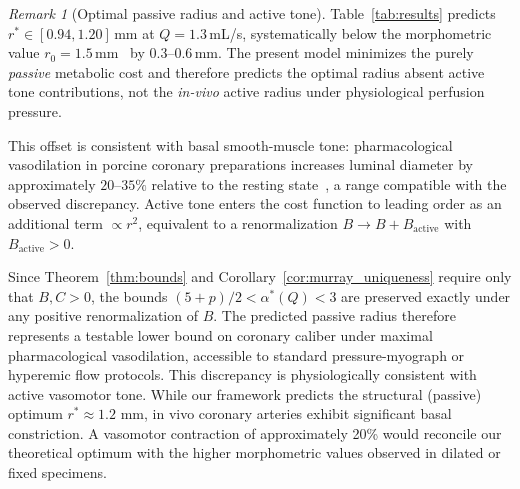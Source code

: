 \documentclass[11pt,a4paper]{article}
\theoremstyle{remark}
\newtheorem{remark}{Remark}
\begin{document}
\begin{remark}[Optimal passive radius and active tone]
\label{rem:tone}
Table~\ref{tab:results} predicts $r^*\in[0.94, 1.20]$\,mm at $Q=1.3$\,mL/s,
systematically below the morphometric value $r_0=1.5$\,mm~\cite{Kassab1993}
by $0.3$--$0.6$\,mm. The present model minimizes the purely \emph{passive}
metabolic cost and therefore predicts the optimal radius absent active tone
contributions, not the \textit{in-vivo} active radius under physiological
perfusion pressure.

This offset is consistent with basal smooth-muscle tone: pharmacological
vasodilation in porcine coronary preparations increases luminal diameter by
approximately $20$--$35\%$ relative to the resting
state~\cite{Taber1998,Kassab1993},
a range compatible with the observed discrepancy. Active tone enters the cost
function to leading order as an additional term $\propto r^2$, equivalent to a
renormalization $B \to B + B_{\mathrm{active}}$ with $B_{\mathrm{active}} > 0$.

Since Theorem~\ref{thm:bounds} and Corollary~\ref{cor:murray_uniqueness} require
only that
$B,C > 0$, the bounds $(5+p)/2 < \alpha^*(Q) < 3$ are preserved exactly under
any positive renormalization of $B$. The predicted passive radius therefore
represents a testable lower bound on coronary caliber under maximal
pharmacological
vasodilation, accessible to standard pressure-myograph or hyperemic flow
protocols. This discrepancy is physiologically consistent with active vasomotor
tone. While our framework predicts the structural (passive) optimum $r^* \approx
1.2$ mm, in vivo coronary arteries exhibit significant basal constriction. A
vasomotor contraction of approximately 20\% would reconcile our theoretical
optimum with the higher morphometric values observed in dilated or fixed
specimens.
\end{remark}
\end{document}
